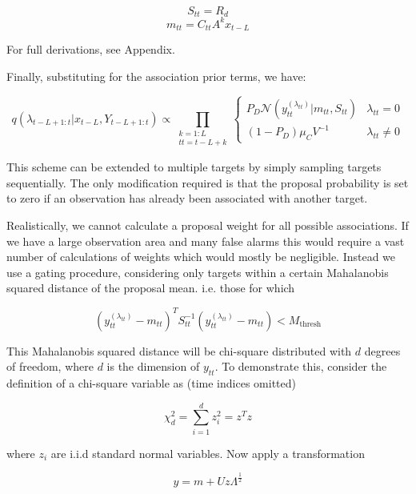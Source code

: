 \begin{equation} S_{tt} = R_d \end{equation}
\begin{equation} m_{tt} = C_{tt} A^k x_{t-L} \label{eq:} \end{equation}

For full derivations, see Appendix.

Finally, substituting for the association prior terms, we have:

\begin{equation}
q(\lambda_{t-L+1:t}|x_{t-L}, Y_{t-L+1:t}) \propto \prod_{\substack{k=1:L\\tt=t-L+k}} \begin{cases}
P_D \mathcal{N}(y_{tt}^{(\lambda_{tt})}|m_{tt}, S_{tt}) & \lambda_{tt}=0 \\
(1-P_D) \mu_C V^{-1} & \lambda_{tt} \ne 0 \end{cases}
\label{eq:}
\end{equation}

This scheme can be extended to multiple targets by simply sampling targets sequentially. The only modification required is that the proposal probability is set to zero if an observation has already been associated with another target.

Realistically, we cannot calculate a proposal weight for all possible associations. If we have a large observation area and many false alarms this would require a vast number of calculations of weights which would mostly be negligible. Instead we use a gating procedure, considering only targets within a certain Mahalanobis squared distance of the proposal mean. i.e. those for which

\begin{equation}
(y_{tt}^{(\lambda_{tt})} - m_{tt})^T S_{tt}^{-1} (y_{tt}^{(\lambda_{tt})} - m_{tt}) < M_{\text{thresh}}
\end{equation}

This Mahalanobis squared distance will be chi-square distributed with $d$ degrees of freedom, where $d$ is the dimension of $y_{tt}$. To demonstrate this, consider the definition of a chi-square variable as (time indices omitted)

\begin{equation}
\chi_d^2 = \sum_{i=1}^d z_i^2 = z^T z
\end{equation}

where $z_i$ are i.i.d standard normal variables. Now apply a transformation

\begin{equation}
y = m + Uz \Lambda^{\frac{1}{2}}
\end{equation}

